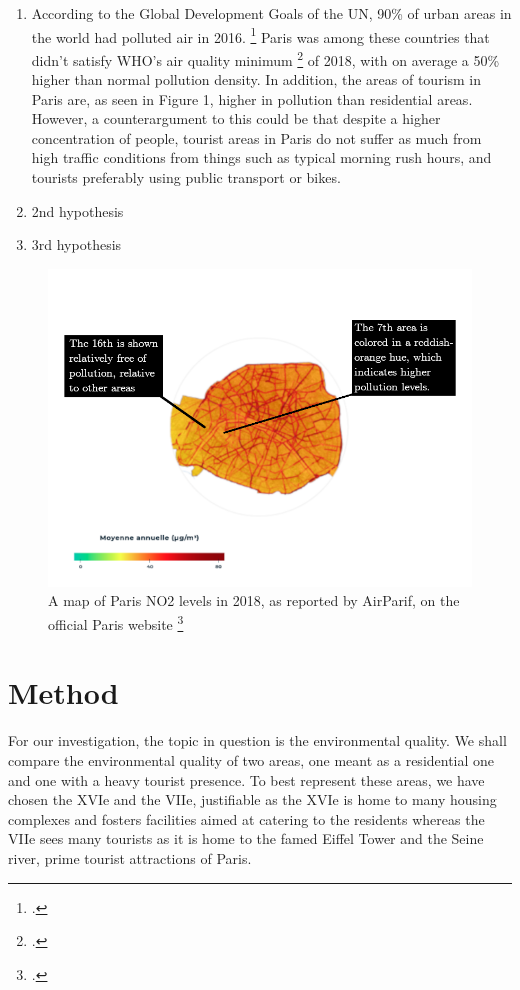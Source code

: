 \documentclass[11pt,letterpaper]{article}
\begin{document}
\begin{enumerate}
    \item According to the Global Development Goals of the UN, 90\% of urban areas in the world had polluted air in 2016. \footcite{sdg_report_2020} Paris was among these countries that didn't satisfy WHO's air quality minimum \footcite{ambient_outdoor_air_pollution_2018} of 2018, with on average a 50\% higher than normal pollution density. In addition, the areas of tourism in Paris are, as seen in Figure 1, higher in pollution than residential areas. However, a counterargument to this could be that despite a higher concentration of people, tourist areas in Paris do not suffer as much from high traffic conditions from things such as typical morning rush hours, and tourists preferably using public transport or bikes.

    \item 2nd hypothesis
    \item 3rd hypothesis
\end{enumerate}


\begin{figure}[h!]
    \centering
    \includegraphics[width=0.7\linewidth]{no2_map.png}
    \caption{A map of Paris NO2 levels in 2018, as reported by AirParif, on the official Paris website \footcite{paris_air_qual}}
\end{figure}



\section{Method}


For our investigation, the topic in question is the environmental quality. We shall compare the environmental quality of two areas, one meant as a residential one and one with a heavy tourist presence. To best represent these areas, we have chosen the XVIe and the VIIe, justifiable as the XVIe is home to many housing complexes and fosters facilities aimed at catering to the residents whereas the VIIe sees many tourists as it is home to the famed Eiffel Tower and the Seine river, prime tourist attractions of Paris.
\end{document}
